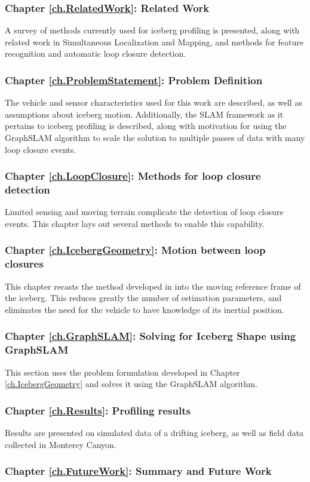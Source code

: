 \subsubsection*{Chapter \ref{ch.RelatedWork}: Related Work} A survey of methods currently used for iceberg profiling is presented, along with related work in Simultaneous Localization and Mapping, and methods for feature recognition and automatic loop closure detection.

\subsubsection*{Chapter \ref{ch.ProblemStatement}: Problem Definition} The vehicle and sensor characteristics used for this work are described, as well as assumptions about iceberg motion. Additionally, the SLAM framework as it pertains to iceberg profiling is described, along with motivation for using the GraphSLAM algorithm to scale the solution to multiple passes of data with many loop closure events.

\subsubsection*{Chapter \ref{ch.LoopClosure}: Methods for loop closure detection} Limited sensing and moving terrain complicate the detection of loop closure events. This chapter lays out several methods to enable this capability.

\subsubsection*{Chapter \ref{ch.IcebergGeometry}: Motion between loop closures}  This chapter recasts the method developed in \cite{Kimball2011b} into the moving reference frame of the iceberg. This reduces greatly the number of estimation parameters, and eliminates the need for the vehicle to have knowledge of its inertial position.

\subsubsection*{Chapter \ref{ch.GraphSLAM}: Solving for Iceberg Shape using GraphSLAM} This section uses the problem formulation developed in Chapter \ref{ch.IcebergGeometry} and solves it using the GraphSLAM algorithm.

\subsubsection*{Chapter \ref{ch.Results}: Profiling results} Results are presented on simulated data of a drifting iceberg, as well as field data collected in Monterey Canyon. 

\subsubsection*{Chapter \ref{ch.FutureWork}: Summary and Future Work}

